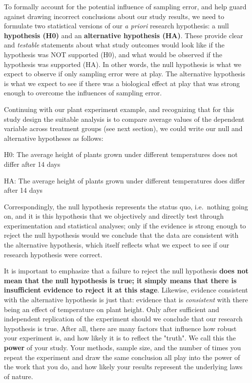 \documentclass[
]{book}
\begin{document}
To formally account for the potential influence of sampling error, and help guard against drawing incorrect conclusions about our study results, we need to formulate two statistical versions of our \emph{a priori} research hypothesis: a null \textbf{hypothesis (H0)} and an \textbf{alternative hypothesis (HA)}. These provide clear and \emph{testable} statements about what study outcomes would look like if the hypothesis was NOT supported (H0), and what would be observed if the hypothesis was supported (HA). In other words, the null hypothesis is what we expect to observe if only sampling error were at play. The alternative hypothesis is what we expect to see if there was a biological effect at play that was strong enough to overcome the influences of sampling error.

Continuing with our plant experiment example, and recognizing that for this study design the suitable analysis is to compare average values of the dependent variable across treatment groups (see next section), we could write our null and alternative hypotheses as follows:

H0: The average height of plants grown under different temperatures does not differ after 14 days

HA: The average height of plants grown under different temperatures does differ after 14 days

Correspondingly, the null hypothesis represents the status quo, i.e.~nothing going on, and it is this hypothesis that we objectively and directly test through experimentation and statistical analyses; only if the evidence is strong enough to reject the null hypothesis would we conclude that the data are consistent with the alternative hypothesis, which itself reflects what we expect to see if our research hypothesis were correct.

It is important to emphasize that a failure to reject the null hypothesis \textbf{does not mean that the null hypothesis is true; it simply means that there is insufficient evidence to reject it at this stage}. Likewise, evidence consistent with the alternative hypothesis is just that: evidence that is \emph{consistent} with there being an effect of temperature on plant height. Only after sufficient and independent replication of the experiment should we conclude that our research hypothesis is true. After all, there are many factors that influence how robust your experiment is, and how likely it is to reflect the "truth". We call this the \textbf{power} of your study. Your methods, sample size, and the number of times you repeat the experiment and draw the same conclusion all play into the power of the work that you do, and how likely your results represent the underlying laws of nature.
\end{document}
